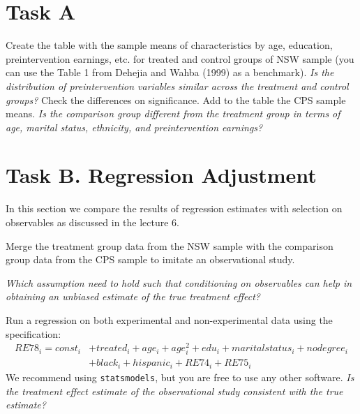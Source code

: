 \section*{Task A} 

\begin{boenumerate}

  \item Create the table with the sample means of characteristics by age, education, preintervention earnings, etc. for treated and control groups of NSW sample (you can use the Table 1 from  Dehejia and Wahba (1999) as a benchmark). \emph{Is the distribution of preintervention variables similar across the treatment and control groups?} Check the differences on significance. Add to the table the CPS sample means. \emph{Is the comparison group different from the treatment group in terms of age, marital status, ethnicity, and preintervention earnings?}

\end{boenumerate}


\section*{Task B. Regression Adjustment}

In this section we compare the results of regression estimates with selection on observables as discussed in the lecture 6. 

\begin{boenumerate}
  \item Merge the treatment group data from the NSW sample with the comparison group data from the CPS sample to imitate an observational study.

\item \emph{Which assumption need to hold such that conditioning on observables can help in obtaining an unbiased estimate of the true treatment effect?}

\item Run a regression on both experimental and non-experimental data using the specification:
\begin{align*}
  RE78_i = const_i &+ treated_i + age_i + age_i^2 + edu_i + maritalstatus_i + nodegree_i\\
	 &+ black_i + hispanic_i + RE74_i + RE75_i
\end{align*}
We recommend using \texttt{statsmodels}, but you are free to use any other software.
\emph{Is the treatment effect estimate of the observational study consistent with the true estimate?} 
\end{boenumerate}

